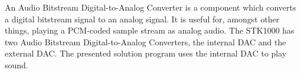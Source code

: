 An Audio Bitstream Digital-to-Analog Converter is a component which converts a digital bitstream signal to an analog signal.
It is useful for, amongst other things, playing a PCM-coded sample stream as analog audio.
The STK1000 has two Audio Bitstream Digital-to-Analog Converters, the internal DAC and the external DAC.
The presented solution program uses the internal DAC to play sound.
